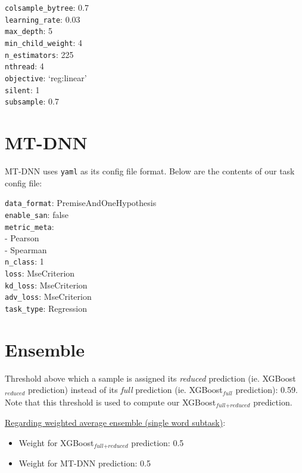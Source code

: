 \documentclass{dcthesis}
\theoremstyle{definition}
\theoremstyle{remark}
\begin{document}
\indent \texttt{colsample\_bytree}: 0.7\\
\indent \texttt{learning\_rate}: 0.03\\
\indent \texttt{max\_depth}: 5\\
\indent \texttt{min\_child\_weight}: 4\\
\indent \texttt{n\_estimators}: 225\\
\indent \texttt{nthread}: 4\\
\indent \texttt{objective}: `reg:linear'\\
\indent \texttt{silent}: 1\\
\indent \texttt{subsample}: 0.7

\section{MT-DNN}
\label{appendix:mt_dnn_hyperparameters}

MT-DNN uses \texttt{yaml} as its config file format. Below are the contents of our task config file:

\indent \texttt{data\_format}: PremiseAndOneHypothesis\\
\indent \texttt{enable\_san}: false\\
\indent \texttt{metric\_meta}:\\
\indent - Pearson\\
\indent - Spearman\\
\indent \texttt{n\_class}: 1\\
\indent \texttt{loss}: MseCriterion\\
\indent \texttt{kd\_loss}: MseCriterion\\
\indent \texttt{adv\_loss}: MseCriterion\\
\indent \texttt{task\_type}: Regression

\section{Ensemble}

Threshold above which a sample is assigned its \textit{reduced} prediction (ie. XGBoost$_\textit{reduced}$ prediction) instead of its \textit{full} prediction (ie. XGBoost$_\textit{full}$ prediction): 0.59. Note that this threshold is used to compute our XGBoost$
_{\textit{full}+\textit{reduced}}$ prediction.

\noindent \underline{Regarding weighted average ensemble (single word subtask)}:
\begin{itemize}
  \item Weight for XGBoost$_{\textit{full}+\textit{reduced}}$ prediction: 0.5
  \item Weight for MT-DNN prediction: 0.5
\end{itemize}
\end{document}
